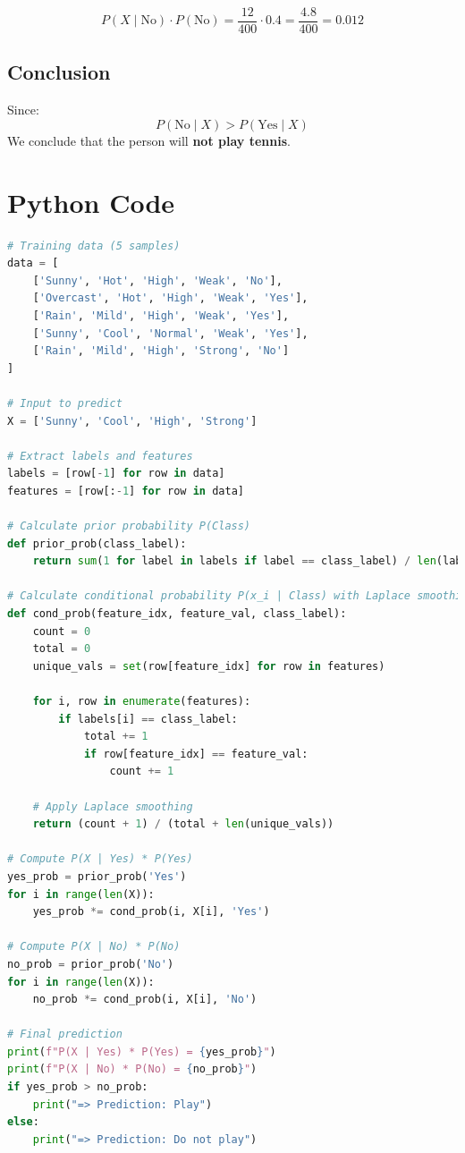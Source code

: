 \documentclass{article}
\begin{document}
$$
P(X \mid \text{No}) \cdot P(\text{No}) = \frac{12}{400} \cdot 0.4 = \frac{4.8}{400} = 0.012
$$

\subsection*{Conclusion}

Since:
$$
P(\text{No} \mid X) > P(\text{Yes} \mid X)
$$
We conclude that the person will \textbf{not play tennis}.

\section*{Python Code}
\begin{lstlisting}[language=Python, caption={Naive Bayes Classifier}]
# Training data (5 samples)
data = [
    ['Sunny', 'Hot', 'High', 'Weak', 'No'],
    ['Overcast', 'Hot', 'High', 'Weak', 'Yes'],
    ['Rain', 'Mild', 'High', 'Weak', 'Yes'],
    ['Sunny', 'Cool', 'Normal', 'Weak', 'Yes'],
    ['Rain', 'Mild', 'High', 'Strong', 'No']
]

# Input to predict
X = ['Sunny', 'Cool', 'High', 'Strong']

# Extract labels and features
labels = [row[-1] for row in data]
features = [row[:-1] for row in data]

# Calculate prior probability P(Class)
def prior_prob(class_label):
    return sum(1 for label in labels if label == class_label) / len(labels)

# Calculate conditional probability P(x_i | Class) with Laplace smoothing
def cond_prob(feature_idx, feature_val, class_label):
    count = 0
    total = 0
    unique_vals = set(row[feature_idx] for row in features)

    for i, row in enumerate(features):
        if labels[i] == class_label:
            total += 1
            if row[feature_idx] == feature_val:
                count += 1

    # Apply Laplace smoothing
    return (count + 1) / (total + len(unique_vals))

# Compute P(X | Yes) * P(Yes)
yes_prob = prior_prob('Yes')
for i in range(len(X)):
    yes_prob *= cond_prob(i, X[i], 'Yes')

# Compute P(X | No) * P(No)
no_prob = prior_prob('No')
for i in range(len(X)):
    no_prob *= cond_prob(i, X[i], 'No')

# Final prediction
print(f"P(X | Yes) * P(Yes) = {yes_prob}")
print(f"P(X | No) * P(No) = {no_prob}")
if yes_prob > no_prob:
    print("=> Prediction: Play")
else:
    print("=> Prediction: Do not play")
\end{lstlisting}
\end{document}
